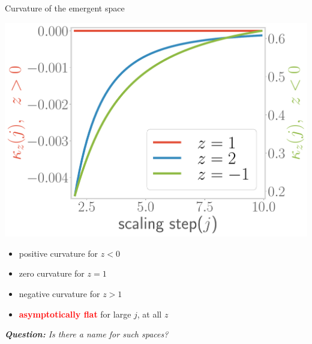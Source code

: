 \documentclass[11pt,aspectratio=169]{beamer}
\newcommand{\focus}[1]{\textcolor{red}{\bf{#1}}}
\begin{document}
\begin{frame}{Curvature of the emergent space}
\begin{minipage}{0.45\textwidth}
	\includegraphics[width=\textwidth]{figures/curvature-pos.pdf}
\end{minipage}
\begin{minipage}{0.5\textwidth}
	\begin{itemize}
		\item positive curvature for \(z < 0\)\\[10pt]
		\item zero curvature for \(z = 1\)\\[10pt]
		\item negative curvature for \(z  > 1\)\\[10pt]
		\item \focus{asymptotically flat} for large \(j\), at all \(z\)
	\end{itemize}
\end{minipage}

\vspace*{\fill}
{\it {\large \bf Question:} Is there a name for such spaces?}
\end{frame}
\end{document}
